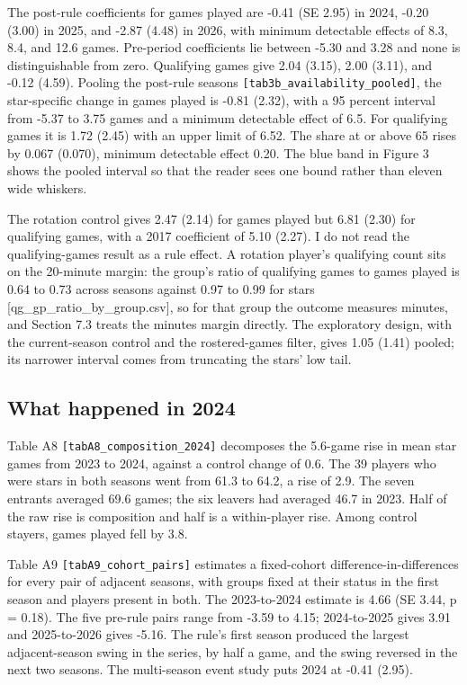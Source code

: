 \documentclass[11pt]{article}
\begin{document}
The post-rule coefficients for games played are -0.41 (SE 2.95) in 2024, -0.20 (3.00) in 2025, and -2.87 (4.48) in 2026, with minimum detectable effects of 8.3, 8.4, and 12.6 games. Pre-period coefficients lie between -5.30 and 3.28 and none is distinguishable from zero. Qualifying games give 2.04 (3.15), 2.00 (3.11), and -0.12 (4.59). Pooling the post-rule seasons {\small\texttt{[tab3b\_availability\_pooled]}}, the star-specific change in games played is -0.81 (2.32), with a 95 percent interval from -5.37 to 3.75 games and a minimum detectable effect of 6.5. For qualifying games it is 1.72 (2.45) with an upper limit of 6.52. The share at or above 65 rises by 0.067 (0.070), minimum detectable effect 0.20. The blue band in Figure 3 shows the pooled interval so that the reader sees one bound rather than eleven wide whiskers.

The rotation control gives 2.47 (2.14) for games played but 6.81 (2.30) for qualifying games, with a 2017 coefficient of 5.10 (2.27). I do not read the qualifying-games result as a rule effect. A rotation player's qualifying count sits on the 20-minute margin: the group's ratio of qualifying games to games played is 0.64 to 0.73 across seasons against 0.97 to 0.99 for stars [qg\_gp\_ratio\_by\_group.csv], so for that group the outcome measures minutes, and Section 7.3 treats the minutes margin directly. The exploratory design, with the current-season control and the rostered-games filter, gives 1.05 (1.41) pooled; its narrower interval comes from truncating the stars' low tail.


\subsection*{What happened in 2024}


Table A8 {\small\texttt{[tabA8\_composition\_2024]}} decomposes the 5.6-game rise in mean star games from 2023 to 2024, against a control change of 0.6. The 39 players who were stars in both seasons went from 61.3 to 64.2, a rise of 2.9. The seven entrants averaged 69.6 games; the six leavers had averaged 46.7 in 2023. Half of the raw rise is composition and half is a within-player rise. Among control stayers, games played fell by 3.8.

Table A9 {\small\texttt{[tabA9\_cohort\_pairs]}} estimates a fixed-cohort difference-in-differences for every pair of adjacent seasons, with groups fixed at their status in the first season and players present in both. The 2023-to-2024 estimate is 4.66 (SE 3.44, p = 0.18). The five pre-rule pairs range from -3.59 to 4.15; 2024-to-2025 gives 3.91 and 2025-to-2026 gives -5.16. The rule's first season produced the largest adjacent-season swing in the series, by half a game, and the swing reversed in the next two seasons. The multi-season event study puts 2024 at -0.41 (2.95).
\end{document}
